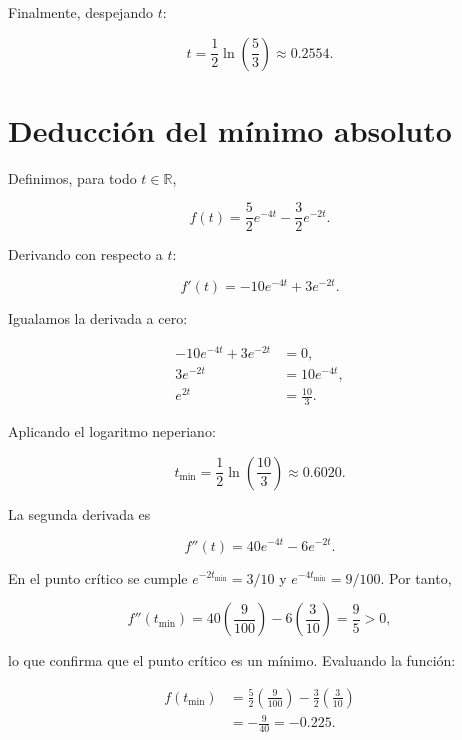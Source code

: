 \documentclass[12pt,a4paper]{article}
\begin{document}
Finalmente, despejando $t$:

\begin{equation}
    \boxed{
    t=\frac{1}{2}\ln\left(\frac{5}{3}\right)
    \approx 0.2554
    }.
\end{equation}

\section*{Deducción del mínimo absoluto}

Definimos, para todo $t\in\mathbb{R}$,

\begin{equation}
    f(t)=\frac{5}{2}e^{-4t}-\frac{3}{2}e^{-2t}.
\end{equation}

Derivando con respecto a $t$:

\begin{equation}
    f'(t)=-10e^{-4t}+3e^{-2t}.
\end{equation}

Igualamos la derivada a cero:

\begin{align}
    -10e^{-4t}+3e^{-2t}&=0,\\
    3e^{-2t}&=10e^{-4t},\\
    e^{2t}&=\frac{10}{3}.
\end{align}

Aplicando el logaritmo neperiano:

\begin{equation}
    t_{\min}=\frac{1}{2}\ln\left(\frac{10}{3}\right)
    \approx 0.6020.
\end{equation}

La segunda derivada es

\begin{equation}
    f''(t)=40e^{-4t}-6e^{-2t}.
\end{equation}

En el punto crítico se cumple $e^{-2t_{\min}}=3/10$ y
$e^{-4t_{\min}}=9/100$. Por tanto,

\begin{equation}
    f''(t_{\min})=40\left(\frac{9}{100}\right)
    -6\left(\frac{3}{10}\right)=\frac{9}{5}>0,
\end{equation}

lo que confirma que el punto crítico es un mínimo. Evaluando la función:

\begin{align}
    f(t_{\min})&=\frac{5}{2}\left(\frac{9}{100}\right)
    -\frac{3}{2}\left(\frac{3}{10}\right)\\
    &=\boxed{-\frac{9}{40}=-0.225}.
\end{align}
\end{document}
